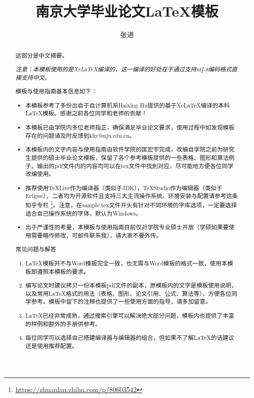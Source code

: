 \documentclass[winfonts,master,twoside]{njuthesis}
\title{南京大学毕业论文\LaTeX 模板}
\author{张进}
\institute{南京大学}
\begin{document}

\maketitle
\makeenglishtitle


\frontmatter

\begin{abstract}
	这部分是中文摘要。
	
	\textit{注意：本模板使用的是XeLaTeX编译的，这一编译的好处在于通过支持utf-8编码格式直接支持中文。}
	
	模板与使用指南基本信息如下：
	\begin{itemize}
		\item 本模板参考了多份出自于自计算机系Haixing Hu提供的基于XeLaTeX编译的本科LaTeX模板。感谢之前各位同学和老师的贡献！
		\item 本模板已由学院内多位老师指正，确保满足毕业论文要求，使用过程中如发现模板存在的问题请及时反馈到khy@nju.edu.cn。
		\item 本模板内的文字内容与使用指南由软件学院的匡宏宇完成，改编自学院之前为研究生提供的硕士毕业论文模板，保留了各个参考模板提供的一些表格、图形和算法例子。输出的pdf文件内的内容均可以在tex文件中找到对应，尽可能地方便各位同学改编使用。
		\item 推荐使用TeXLive作为编译器（类似于JDK），TeXStudio作为编辑器（类似于Eclipse），二者均为开源软件且支持三大主流操作系统。环境安装与配置请参考这条知乎专栏 \footnote{\url{https://zhuanlan.zhihu.com/p/80603542}}。注意，在sample.tex文件开头有针对不同环境的字库选项，一定要选择适合自己操作系统的字体，默认为Windows。
		\item  出于严谨性的考量，本模板与使用指南目前仅对学院专业硕士开放（学硕如果要使用需要略作修改，可邮件联系我），请大家不要外传。
	\end{itemize}
	
	常见问题与解答
	\begin{enumerate}
		\item LaTeX模板并不与Word模板完全一致，也无需与Word模板的格式一致，使用本模板即遵照本模板的要求。
		\item 编写论文时建议拷贝一份本模板pdf文件的副本，原模板内的文字是模板使用说明，以及常用LaTeX格式的用法（表格、图形、论文引用、公式、算法等），方便各位同学参考。模板中留下的注释也提供了一些使用方面的指导，请多加留意。
		\item LaTeX已经非常成熟，通过搜索引擎可以解决绝大部分问题，模板内也提供了丰富的样例和额外的手册供参考。
		\item 每位同学可以选择自己搭建编译器与编辑器的组合，但如果不了解LaTeX的话建议还是使用推荐配置。
	\end{enumerate}
\end{abstract}
\end{document}
